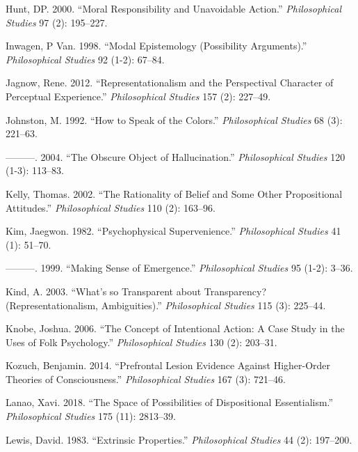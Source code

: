 \documentclass[
  10pt,
  letterpaper,
  DIV=11,
  numbers=noendperiod,
  twoside]{scrartcl}
\newlength{\cslhangindent}
\newenvironment{CSLReferences}[2] %
 {\begin{list}{}{%
  \setlength{\itemindent}{0pt}
  \setlength{\leftmargin}{0pt}
  \setlength{\parsep}{0pt}
  \ifodd #1
   \setlength{\leftmargin}{\cslhangindent}
   \setlength{\itemindent}{-1\cslhangindent}
  \fi
  \setlength{\itemsep}{#2\baselineskip}}}
 {\end{list}}
\begin{document}
\begin{CSLReferences}{1}{0}
Hunt, DP. 2000. {``Moral Responsibility and Unavoidable Action.''}
\emph{Philosophical Studies} 97 (2): 195--227.

Inwagen, P Van. 1998. {``Modal Epistemology (Possibility Arguments).''}
\emph{Philosophical Studies} 92 (1-2): 67--84.

Jagnow, Rene. 2012. {``Representationalism and the Perspectival
Character of Perceptual Experience.''} \emph{Philosophical Studies} 157
(2): 227--49.

Johnston, M. 1992. {``How to Speak of the Colors.''} \emph{Philosophical
Studies} 68 (3): 221--63.

---------. 2004. {``The Obscure Object of Hallucination.''}
\emph{Philosophical Studies} 120 (1-3): 113--83.

Kelly, Thomas. 2002. {``The Rationality of Belief and Some Other
Propositional Attitudes.''} \emph{Philosophical Studies} 110 (2):
163--96.

Kim, Jaegwon. 1982. {``Psychophysical Supervenience.''}
\emph{Philosophical Studies} 41 (1): 51--70.

---------. 1999. {``Making Sense of Emergence.''} \emph{Philosophical
Studies} 95 (1-2): 3--36.

Kind, A. 2003. {``What's so Transparent about Transparency?
(Representationalism, Ambiguities).''} \emph{Philosophical Studies} 115
(3): 225--44.

Knobe, Joshua. 2006. {``The Concept of Intentional Action: A Case Study
in the Uses of Folk Psychology.''} \emph{Philosophical Studies} 130 (2):
203--31.

Kozuch, Benjamin. 2014. {``Prefrontal Lesion Evidence Against
Higher-Order Theories of Consciousness.''} \emph{Philosophical Studies}
167 (3): 721--46.

Lanao, Xavi. 2018. {``The Space of Possibilities of Dispositional
Essentialism.''} \emph{Philosophical Studies} 175 (11): 2813--39.

Lewis, David. 1983. {``Extrinsic Properties.''} \emph{Philosophical
Studies} 44 (2): 197--200.


\end{CSLReferences}
\end{document}

